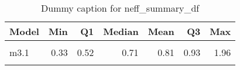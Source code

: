 \begin{table}
\centering
\caption{Dummy caption for neff_summary_df}
\centering
\fontsize{10}{12}\selectfont
\begin{tabular}[t]{lrrrrrr}
\toprule
Model & Min & Q1 & Median & Mean & Q3 & Max\\
\midrule
\cellcolor{gray!10}{m2} & \cellcolor{gray!10}{0.23} & \cellcolor{gray!10}{0.42} & \cellcolor{gray!10}{0.71} & \cellcolor{gray!10}{0.76} & \cellcolor{gray!10}{0.91} & \cellcolor{gray!10}{1.56}\\
m3.1 & 0.33 & 0.52 & 0.71 & 0.81 & 0.93 & 1.96\\
\cellcolor{gray!10}{m4} & \cellcolor{gray!10}{0.34} & \cellcolor{gray!10}{0.39} & \cellcolor{gray!10}{0.62} & \cellcolor{gray!10}{0.75} & \cellcolor{gray!10}{0.92} & \cellcolor{gray!10}{1.95}\\
\bottomrule
\end{tabular}
\end{table}
